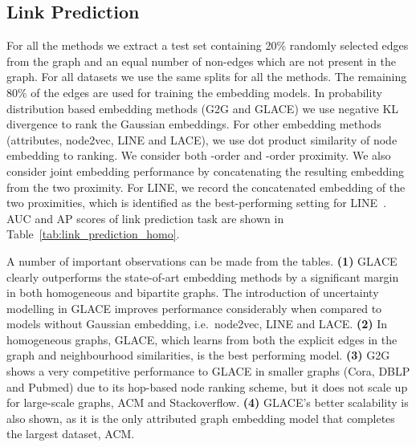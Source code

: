 \documentclass[runningheads]{llncs}
\begin{document}
\subsection{Link Prediction}

For all the methods we extract a test set containing 20\% randomly selected edges from the graph and an equal number of non-edges which are not present in the graph. 
For all datasets we use the same splits for all the methods. 
The remaining 80\% of the edges are used for training the embedding models.
In probability distribution based embedding methods (G2G and GLACE) we use negative KL divergence to rank the Gaussian embeddings. 
For other embedding methods (attributes, node2vec, LINE and LACE), we use dot product similarity of node embedding to ranking.
We consider both -order and -order proximity.  We also consider joint embedding performance by concatenating the resulting embedding from the two proximity. 
For LINE, we record the concatenated embedding of the two proximities, which is identified as the best-performing setting for LINE~\cite{DBLP:line}. 
AUC and AP scores of link prediction task are shown in Table~\ref{tab:link_prediction_homo}.

A number of important observations can be made from the tables. \textbf{(1)} GLACE clearly outperforms the state-of-art embedding methods by a significant margin in both homogeneous and bipartite graphs. The introduction of uncertainty modelling in GLACE improves performance considerably when compared to models without Gaussian embedding, i.e.\ node2vec, LINE and LACE. \textbf{(2)} In homogeneous graphs, GLACE, which learns from both the explicit edges in the graph and neighbourhood similarities, is the best performing model. \textbf{(3)} G2G shows a very competitive performance to GLACE in smaller graphs (Cora, DBLP and Pubmed) due to its hop-based node ranking scheme, but it does not scale up for large-scale graphs, ACM and Stackoverflow. 
\textbf{(4)} GLACE's better scalability is also shown, as it is the only attributed graph embedding model that completes the largest dataset, ACM.
\end{document}
